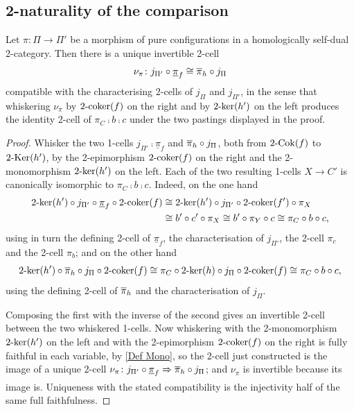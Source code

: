\subsection{2-naturality of the comparison}\label{SS:NaturalComparison}

\begin{theorem}
  \label{T:NaturalComparison}   \leanok
  Let \(\pi\colon\Pi\to\Pi'\) be a morphism of pure configurations in a homologically self-dual 2-category. Then there is a unique invertible 2-cell
	\[
		\nu_\pi\colon j_{\Pi'}\circ\underline{\pi}_f\cong\overline{\pi}_h\circ j_\Pi
	\]
	compatible with the characterising 2-cells of \(j_\Pi\) and \(j_{\Pi'}\), in the sense that whiskering \(\nu_\pi\) by \(2\text{-}\mathrm{coker}(f)\) on the right and by \(2\text{-}\mathrm{ker}(h')\) on the left produces the identity 2-cell of \(\pi_C\comp b\comp c\) under the two pastings displayed in the proof.
\end{theorem}

\begin{proof}
  
  \leanok
  Whisker the two 1-cells \(j_{\Pi'}\comp\underline{\pi}_f\) and \(\overline{\pi}_h\circ j_\Pi\), both from \(2\text{-}\mathrm{Cok}(f)\) to \(2\text{-}\mathrm{Ker}(h')\), by the 2-epimorphism \(2\text{-}\mathrm{coker}(f)\) on the right and the 2-monomorphism \(2\text{-}\mathrm{ker}(h')\) on the left. Each of the two resulting 1-cells \(X\to C'\) is canonically isomorphic to \(\pi_C\comp b\comp c\). Indeed, on the one hand
	\begin{align*}
		2\text{-}\mathrm{ker}(h')\circ j_{\Pi'}\circ\underline{\pi}_f\circ2\text{-}\mathrm{coker}(f)
		 & \cong2\text{-}\mathrm{ker}(h')\circ j_{\Pi'}\circ2\text{-}\mathrm{coker}(f')\circ\pi_X \\
		 & \cong b'\circ c'\circ\pi_X
		\cong b'\circ\pi_Y\circ c
		\cong\pi_C\circ b\circ c\text{,}
	\end{align*}
	using in turn the defining 2-cell of \(\underline{\pi}_f\), the characterisation of \(j_{\Pi'}\), the 2-cell \(\pi_c\) and the 2-cell \(\pi_b\); and on the other hand
	\[
		2\text{-}\mathrm{ker}(h')\circ\overline{\pi}_h\circ j_\Pi\circ2\text{-}\mathrm{coker}(f)
		\cong\pi_C\circ2\text{-}\mathrm{ker}(h)\circ j_\Pi\circ2\text{-}\mathrm{coker}(f)
		\cong\pi_C\circ b\circ c\text{,}
	\]
	using the defining 2-cell of \(\overline{\pi}_h\) and the characterisation of \(j_\Pi\).

	Composing the first with the inverse of the second gives an invertible 2-cell between the two whiskered 1-cells. Now whiskering with the 2-monomorphism \(2\text{-}\mathrm{ker}(h')\) on the left and with the 2-epimorphism \(2\text{-}\mathrm{coker}(f)\) on the right is fully faithful in each variable, by \ref{Def Mono}, so the 2-cell just constructed is the image of a unique 2-cell \(\nu_\pi\colon j_{\Pi'}\circ\underline{\pi}_f\xRightarrow[]{}\overline{\pi}_h\circ j_\Pi\); and \(\nu_\pi\) is invertible because its image is. Uniqueness with the stated compatibility is the injectivity half of the same full faithfulness.
\end{proof}

